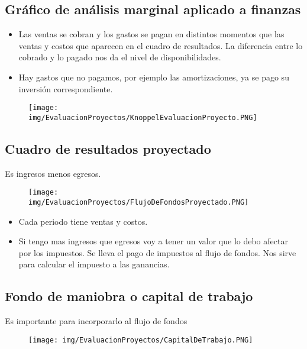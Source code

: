 \documentclass[titlepage,a4paper]{article}
\begin{document}
\newpage
\subsection{Gráfico de análisis marginal aplicado a finanzas}
\begin{itemize}
\item Las ventas se cobran y los gastos se pagan en distintos momentos que las ventas y costos que aparecen en el cuadro de resultados. La diferencia entre lo cobrado y lo pagado nos da el nivel de disponibilidades.
\item Hay gastos que no pagamos, por ejemplo las amortizaciones, ya se pago su inversión correspondiente.
\end{itemize}


\begin{figure}[!htb]
    \centering
    \texttt{[image: img/EvaluacionProyectos/KnoppelEvaluacionProyecto.PNG]}
\end{figure}



\subsection{Cuadro de resultados proyectado}

Es ingresos menos egresos.

\begin{figure}[!htb]
    \centering
    \texttt{[image: img/EvaluacionProyectos/FlujoDeFondosProyectado.PNG]}
\end{figure}

\begin{itemize}
\item Cada periodo tiene ventas y costos.
\item Si tengo mas ingresos que egresos voy a tener un valor que lo debo afectar por los impuestos. Se lleva el pago de impuestos al flujo de fondos. Nos sirve para calcular el impuesto a las ganancias.
\end{itemize}


\subsection{Fondo de maniobra o capital de trabajo}
Es importante para incorporarlo al flujo de fondos

\begin{figure}[!htb]
    \centering
    \texttt{[image: img/EvaluacionProyectos/CapitalDeTrabajo.PNG]}
\end{figure}
\end{document}
